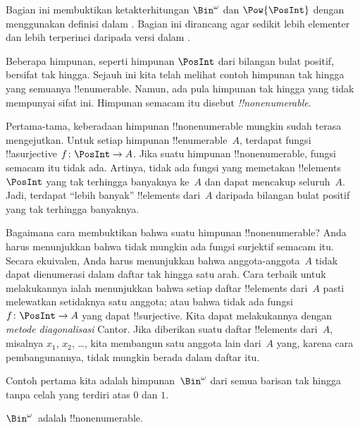 \documentclass[../../../include/open-logic-section]{subfiles}
\begin{document}


\begin{editorial}
  Bagian ini membuktikan ketakterhitungan $\Bin^\omega$ dan $\Pow{\PosInt}$
  dengan menggunakan definisi dalam . Bagian ini dirancang
  agar sedikit lebih elementer dan lebih terperinci daripada versi dalam
  .
\end{editorial}

Beberapa himpunan, seperti himpunan $\PosInt$ dari bilangan bulat positif,
bersifat tak hingga. Sejauh ini kita telah melihat contoh himpunan tak hingga
yang semuanya !!{enumerable}. Namun, ada pula himpunan tak hingga yang tidak
mempunyai sifat ini. Himpunan semacam itu disebut \emph{!!{nonenumerable}}.

Pertama-tama, keberadaan himpunan !!{nonenumerable} mungkin sudah terasa
mengejutkan. Untuk setiap himpunan !!{enumerable}~$A$, terdapat fungsi
!!a{surjective} $f \colon \PosInt \to A$. Jika suatu himpunan
!!{nonenumerable}, fungsi semacam itu tidak ada. Artinya, tidak ada fungsi yang
memetakan !!{element}s $\PosInt$ yang tak terhingga banyaknya ke~$A$ dan dapat
mencakup seluruh~$A$. Jadi, terdapat ``lebih banyak'' !!{element}s dari~$A$
daripada bilangan bulat positif yang tak terhingga banyaknya.

Bagaimana cara membuktikan bahwa suatu himpunan !!{nonenumerable}? Anda harus
menunjukkan bahwa tidak mungkin ada fungsi surjektif semacam itu. Secara
ekuivalen, Anda harus menunjukkan bahwa anggota-anggota~$A$ tidak dapat
dienumerasi dalam daftar tak hingga satu arah. Cara terbaik untuk melakukannya
ialah menunjukkan bahwa setiap daftar !!{element}s dari~$A$ pasti melewatkan
setidaknya satu anggota; atau bahwa tidak ada fungsi $f\colon \PosInt \to A$
yang dapat !!{surjective}. Kita dapat melakukannya dengan \emph{metode
diagonalisasi} Cantor. Jika diberikan suatu daftar !!{element}s dari~$A$, misalnya
$x_1$, $x_2$, \dots, kita membangun satu anggota lain dari~$A$ yang, karena
cara pembangunannya, tidak mungkin berada dalam daftar itu.

Contoh pertama kita adalah himpunan~$\Bin^\omega$ dari semua barisan tak
hingga tanpa celah yang terdiri atas $0$ dan $1$.

\begin{thm}
$\Bin^\omega$~adalah !!{nonenumerable}.
\end{thm}
\end{document}
